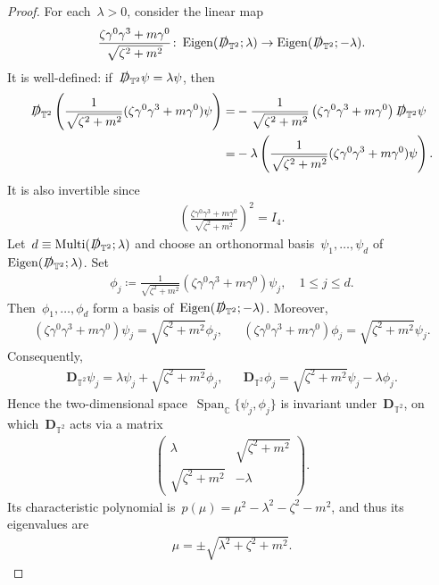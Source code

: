 \documentclass[11pt,final]{amsart}
\newcommand{\C}{\mathbb{C}}
\newcommand{\T}{\mathbb{T}}
\newcommand{\D}{\slashed{D}}
\newcommand{\pD}{\mathbf{D}}
\newcommand{\parenthesis}[1]{\left(#1\right)} %
\DeclareMathOperator{\Eigen}{Eigen}
\DeclareMathOperator{\Mtp}{Multi} %
\DeclareMathOperator{\Span}{Span}
\begin{document}
\begin{proof}
    
    For each~$\lambda>0$, consider the linear map
    \begin{align}
        \frac{\zeta\gamma^0\gamma^3+m\gamma^0}{\sqrt{\zeta^2+m^2}}\colon \Eigen(\D_{\T^2};\lambda)\to \Eigen(\D_{\T^2};-\lambda).
    \end{align}
    It is well-defined: if~$\D_{\T^2}\psi=\lambda\psi$, then 
    \begin{align}
        \D_{\T^2}\parenthesis{\frac{1}{\sqrt{\zeta^2+m^2}}(\zeta\gamma^0\gamma^3+m\gamma^0)\psi}
        =&-\frac{1}{\sqrt{\zeta^2+m^2}}\parenthesis{\zeta\gamma^0\gamma^3+m\gamma^0}
        \D_{\T^2}\psi \\
        =&-\lambda \parenthesis{\frac{1}{\sqrt{\zeta^2+m^2}}(\zeta\gamma^0\gamma^3+m\gamma^0)\psi}. 
    \end{align}
    It is also invertible since 
    \begin{align}
        \parenthesis{ \frac{\zeta\gamma^0\gamma^3+m\gamma^0}{\sqrt{\zeta^2+m^2}} }^2=I_4.
    \end{align}
    Let~$d\equiv \Mtp(\D_{\T^2};\lambda)$ and choose an orthonormal basis~$\psi_1,\dots, \psi_d$ of~$\Eigen(\D_{\T^2};\lambda)$. 
    Set
    \begin{align}
        \phi_j \coloneqq \frac{1}{\sqrt{\zeta^2+m^2}} \parenthesis{\zeta\gamma^0\gamma^3+m\gamma^0}\psi_j,\quad 1\leq j\leq d. 
    \end{align}
    Then~$\phi_1,\dots,\phi_d$ form a basis of~$\Eigen(\D_{\T^2};-\lambda)$. 
    Moreover,
    \begin{align}
        \parenthesis{\zeta\gamma^0\gamma^3+m\gamma^0}\psi_j= \sqrt{\zeta^2+m^2}\phi_j, 
        & & 
        \parenthesis{\zeta\gamma^0\gamma^3+m\gamma^0}\phi_j = \sqrt{\zeta^2+m^2}\psi_j.
    \end{align}
    Consequently,
    \begin{align}
        \pD_{\T^2}\psi_j = \lambda \psi_j+\sqrt{\zeta^2+m^2}\phi_j,
        & & 
        \pD_{\T^2}\phi_j = \sqrt{\zeta^2+m^2}\psi_j-\lambda \phi_j.
    \end{align}
    Hence the two-dimensional space~$\Span_{\C}\{\psi_j,\phi_j\}$ is invariant under~$\pD_{\T^2}$,
    on which~$\pD_{\T^2}$ acts via a matrix
    \begin{align}
        \begin{pmatrix}
            \lambda & \sqrt{\zeta^2+m^2}\\
            \sqrt{\zeta^2+m^2} & -\lambda
        \end{pmatrix}.
    \end{align}
    Its characteristic polynomial is~$p(\mu)=\mu^2-\lambda^2-\zeta^2-m^2$, and thus its eigenvalues are
    \begin{align}
        \mu=\pm\sqrt{\lambda^2+\zeta^2+m^2}.
    \end{align}


\end{proof}
\end{document}
